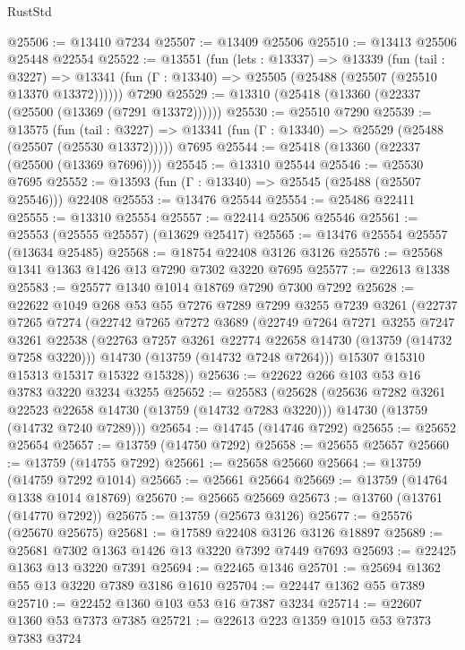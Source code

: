 \begin{lexlean}{RustStd}
\begin{coremodule}
@25506 := @13410 @7234
@25507 := @13409 @25506
@25510 := @13413 @25506 @25448 @22554
@25522 := @13551
    (fun (lets : @13337) =>
    @13339
      (fun (tail : @3227) =>
      @13341 (fun (Γ : @13340) => @25505 (@25488 (@25507 (@25510 @13370 @13372))))))
    @7290
@25529 := @13310 (@25418 (@13360 (@22337 (@25500 (@13369 (@7291 @13372))))))
@25530 := @25510 @7290
@25539 := @13575
    (fun (tail : @3227) => @13341 (fun (Γ : @13340) => @25529 (@25488 (@25507 (@25530 @13372)))))
    @7695
@25544 := @25418 (@13360 (@22337 (@25500 (@13369 @7696))))
@25545 := @13310 @25544
@25546 := @25530 @7695
@25552 := @13593 (fun (Γ : @13340) => @25545 (@25488 (@25507 @25546))) @22408
@25553 := @13476 @25544
@25554 := @25486 @22411
@25555 := @13310 @25554
@25557 := @22414 @25506 @25546
@25561 := @25553 (@25555 @25557) (@13629 @25417)
@25565 := @13476 @25554 @25557 (@13634 @25485)
@25568 := @18754 @22408 @3126 @3126
@25576 := @25568 @1341 @1363 @1426 @13 @7290 @7302 @3220 @7695
@25577 := @22613 @1338
@25583 := @25577 @1340 @1014 @18769 @7290 @7300 @7292
@25628 := @22622
    @1049
    @268
    @53
    @55
    @7276
    @7289
    @7299
    @3255
    @7239
    @3261
    (@22737
      @7265
      @7274
      (@22742
        @7265
        @7272
        @3689
        (@22749
          @7264
          @7271
          @3255
          @7247
          @3261
          @22538
          (@22763 @7257 @3261 @22774 @22658 @14730 (@13759 (@14732 @7258 @3220)))
          @14730
          (@13759 (@14732 @7248 @7264)))
        @15307
        @15310
        @15313
        @15317
        @15322
        @15328))
@25636 := @22622 @266 @103 @53 @16 @3783 @3220 @3234 @3255
@25652 := @25583
    (@25628
      (@25636 @7282 @3261 @22523 @22658 @14730 (@13759 (@14732 @7283 @3220)))
      @14730
      (@13759 (@14732 @7240 @7289)))
@25654 := @14745 (@14746 @7292)
@25655 := @25652 @25654
@25657 := @13759 (@14750 @7292)
@25658 := @25655 @25657
@25660 := @13759 (@14755 @7292)
@25661 := @25658 @25660
@25664 := @13759 (@14759 @7292 @1014)
@25665 := @25661 @25664
@25669 := @13759 (@14764 @1338 @1014 @18769)
@25670 := @25665 @25669
@25673 := @13760 (@13761 (@14770 @7292))
@25675 := @13759 (@25673 @3126)
@25677 := @25576 (@25670 @25675)
@25681 := @17589 @22408 @3126 @3126 @18897
@25689 := @25681 @7302 @1363 @1426 @13 @3220 @7392 @7449 @7693
@25693 := @22425 @1363 @13 @3220 @7391
@25694 := @22465 @1346
@25701 := @25694 @1362 @55 @13 @3220 @7389 @3186 @1610
@25704 := @22447 @1362 @55 @7389
@25710 := @22452 @1360 @103 @53 @16 @7387 @3234
@25714 := @22607 @1360 @53 @7373 @7385
@25721 := @22613 @223 @1359 @1015 @53 @7373 @7383 @3724

\end{coremodule}
\end{lexlean}
